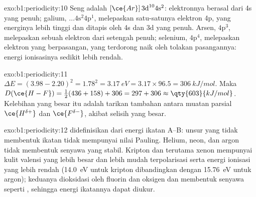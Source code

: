 \begin{solution}{exo:b1:periodicity:10}
Seng adalah $[\ce{Ar}]\,3\text{d}^{10} 4\text{s}^2$: elektronnya berasal
dari 4s yang penuh; galium, $\dots 4\text{s}^2 4\text{p}^1$, melepaskan
satu-satunya elektron 4p, yang energinya lebih tinggi dan ditapis oleh 4s
dan 3d yang penuh. Arsen, $4\text{p}^3$, melepaskan sebuah elektron dari
 setengah penuh; selenium, $4\text{p}^4$, melepaskan elektron
yang berpasangan, yang terdorong naik oleh tolakan pasangannya: energi
ionisasinya sedikit lebih rendah.
\end{solution}

\begin{solution}{exo:b1:periodicity:11}
$\Delta E = (3.98 - 2.20)^2 = 1.78^2 = \qty{3.17}{eV} = 3.17 \times 96.5 =
\qty{306}{kJ/mol}$. Maka $D(\ce{H-F}) = \tfrac12(436 + 158) + 306 = 297 +
306 \approx \qty{603}{kJ/mol}$. Kelebihan yang besar itu adalah tarikan
tambahan antara muatan parsial $\ce{H^{\delta+}}$ dan $\ce{F^{\delta-}}$,
akibat selisih  yang besar.
\end{solution}

\begin{solution}{exo:b1:periodicity:12}
 didefinisikan dari energi ikatan A--B: unsur yang tidak
membentuk ikatan tidak mempunyai nilai Pauling. Helium, neon, dan argon
tidak membentuk senyawa yang stabil. Kripton dan terutama xenon mempunyai
kulit valensi yang lebih besar dan lebih mudah terpolarisasi serta energi
ionisasi yang lebih rendah (\qty{14.0}{eV} untuk kripton dibandingkan
dengan \qty{15.76}{eV} untuk argon); keduanya dioksidasi oleh fluorin dan
oksigen dan membentuk senyawa seperti , sehingga energi
ikatannya dapat diukur.
\end{solution}

